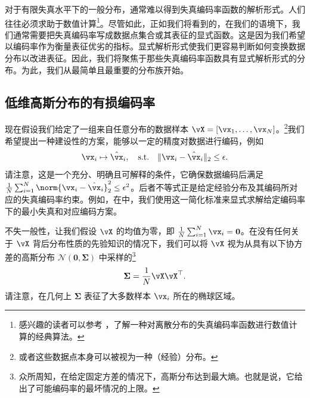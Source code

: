 \documentclass[../../book-main_zh.tex]{subfiles}
\begin{document}
对于有限失真水平下的一般分布，通常难以得到失真编码率函数的解析形式。人们往往必须求助于数值计算\footnote{感兴趣的读者可以参考 \cite{Blahut-1972}，了解一种对离散分布的失真编码率函数进行数值计算的经典算法。}。尽管如此，正如我们将看到的，在我们的语境下，我们通常需要把失真编码率写成数据点集合或其表征的显式函数。这是因为我们希望以编码率作为衡量表征优劣的指标。显式解析形式使我们更容易判断如何变换数据分布以改进表征。因此，我们将聚焦于那些失真编码率函数具有显式解析形式的分布。为此，我们从最简单且最重要的分布族开始。

\subsection{低维高斯分布的有损编码率}\label{subsec:lossy DR}
现在假设我们给定了一组来自任意分布的数据样本 $\vX = [\vx_1, \ldots, \vx_N]$。\footnote{或者这些数据点本身可以被视为一种（经验）分布。}我们希望提出一种建设性的方案，能够以一定的精度对数据进行编码，例如
\begin{equation}
    \vx_i \mapsto \hat \vx_i, \quad \text{s.t.} \quad \|\vx_i -
    \hat \vx_i\|_2 \le \epsilon.
\end{equation}
请注意，这是一个充分、明确且可解释的条件，它确保数据编码后满足 \(\frac{1}{N}\sum_{i = 1}^{N} \norm{\vx_i- \hat \vx_i}_2^{2} \le \epsilon^{2}\)。后者不等式正是给定经验分布及其编码所对应的失真编码率约束。例如，在中，我们使用这一简化标准来显式求解给定编码率下的最小失真和对应编码方案。

不失一般性，让我们假设 $\vX$ 的均值为零，即 $\frac{1}{N} \sum_{i = 1}^{N} \vx_i = \boldsymbol{0}$。在没有任何关于 $\vX$ 背后分布性质的先验知识的情况下，我们可以将 $\vX$ 视为从具有以下协方差的高斯分布 $\mathcal{N}(\boldsymbol{0}, {\boldsymbol{\Sigma}})$ 中采样的\footnote{众所周知，在给定固定方差的情况下，高斯分布达到最大熵。也就是说，它给出了可能编码率的最坏情况的上限。}
\begin{equation}
    {\boldsymbol{\Sigma}} = \frac{1}{N} \vX\vX^\top.
\end{equation}
请注意，在几何上 ${\boldsymbol{\Sigma}}$ 表征了大多数样本 $\vx_i$ 所在的椭球区域。
\end{document}
